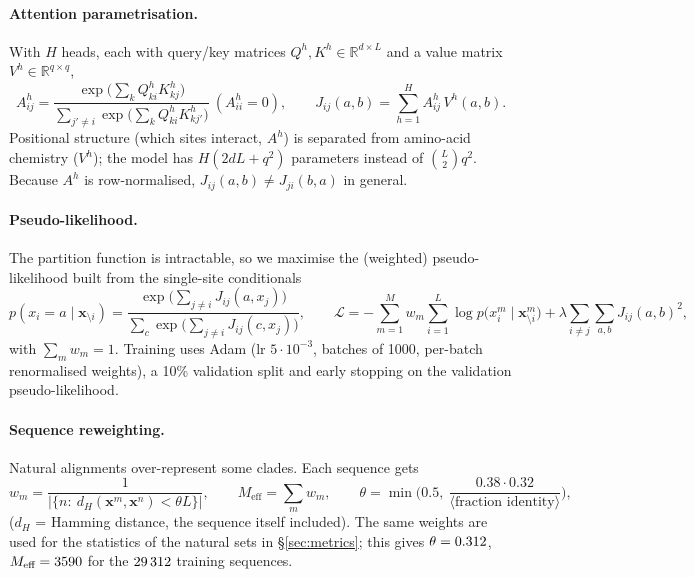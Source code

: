 \documentclass[10pt,a4paper]{article}
\begin{document}
\paragraph{Attention parametrisation.}
With $H$ heads, each with query/key matrices $Q^h,K^h\in\mathbb R^{d\times L}$ and a value
matrix $V^h\in\mathbb R^{q\times q}$,
\begin{equation}
A^h_{ij}=\frac{\exp\big(\sum_k Q^h_{ki}K^h_{kj}\big)}{\sum_{j'\neq i}\exp\big(\sum_k Q^h_{ki}K^h_{kj'}\big)}\ (A^h_{ii}=0),\qquad
J_{ij}(a,b)=\sum_{h=1}^{H}A^h_{ij}\,V^h(a,b).
\end{equation}
Positional structure (which sites interact, $A^h$) is separated from amino-acid
chemistry ($V^h$); the model has $H(2dL+q^2)$ parameters instead of $\binom{L}{2}q^2$.
Because $A^h$ is row-normalised, $J_{ij}(a,b)\neq J_{ji}(b,a)$ in general.

\paragraph{Pseudo-likelihood.}
The partition function is intractable, so we maximise the (weighted) pseudo-likelihood built from
the single-site conditionals
\begin{equation}
p(x_i=a\mid\bm x_{\setminus i})=\frac{\exp\big(\sum_{j\neq i}J_{ij}(a,x_j)\big)}{\sum_{c}\exp\big(\sum_{j\neq i}J_{ij}(c,x_j)\big)},
\qquad
\mathcal L=-\sum_{m=1}^{M}w_m\sum_{i=1}^{L}\log p\big(x^m_i\mid\bm x^m_{\setminus i}\big)
+\lambda\sum_{i\neq j}\sum_{a,b}J_{ij}(a,b)^2 ,
\end{equation}
with $\sum_m w_m=1$. Training uses Adam (lr $5\cdot10^{-3}$, batches of 1000, per-batch
renormalised weights), a 10\% validation split and early stopping on the validation
pseudo-likelihood.

\paragraph{Sequence reweighting.}
Natural alignments over-represent some clades. Each sequence gets
\begin{equation}
w_m=\frac{1}{\big|\{n:\ d_H(\bm x^m,\bm x^n)<\theta L\}\big|},\qquad
M_\text{eff}=\sum_m w_m,\qquad
\theta=\min\!\Big(0.5,\ \frac{0.38\cdot0.32}{\langle\text{fraction identity}\rangle}\Big),
\end{equation}
($d_H$ = Hamming distance, the sequence itself included). The same weights are used for the
statistics of the natural sets in \S\ref{sec:metrics}; this gives $\theta=0.312$,
$M_\text{eff}=3590$ for the $29\,312$ training sequences.
\end{document}
